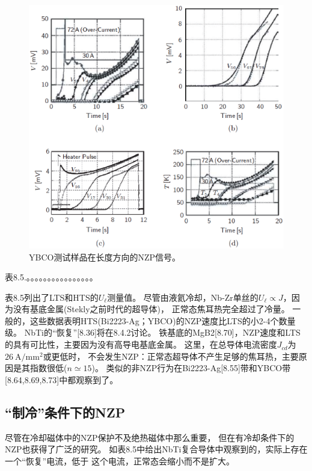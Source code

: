 \begin{figure}
	\centering
	\includegraphics[scale=0.5]{chpt8/figs/fig8.10.eps}
	\caption{YBCO测试样品在长度方向的NZP信号。}
\end{figure}

表8.5.。。。。。。。。。。。。。。。。

表8.5列出了LTS和HTS的$U_\ell$测量值。
尽管由液氦冷却，Nb-Zr单丝的$U_\ell\propto J$，因为没有基底金属(Stekly之前时代的超导体)，
正常态焦耳热完全超过了冷量。
一般的，这些数据表明HTS(Bi2223-Ag；YBCO)的NZP速度比LTS的小2-4个数量级。
NbTi的“恢复”[8.36]将在8.4.2讨论。
铁基底的MgB2[8.70]，NZP速度和LTS的具有可比性，主要因为没有高导电基底金属。
这里，在总导体电流密度$J_{cd}$为$26\ \mathrm{ A/mm^2}$或更低时，
不会发生NZP：正常态超导体不产生足够的焦耳热，主要原因是其指数很低($n\simeq 15$)。
类似的非NZP行为在Bi2223-Ag[8.55]带和YBCO带[8.64,8.69,8.73]中都观察到了。

\subsection{“制冷”条件下的NZP}
尽管在冷却磁体中的NZP保护不及绝热磁体中那么重要，
但在有冷却条件下的NZP也获得了广泛的研究。
如表8.5中给出NbTi复合导体中观察到的，实际上存在一个“恢复”电流，低于
这个电流，正常态会缩小而不是扩大。

